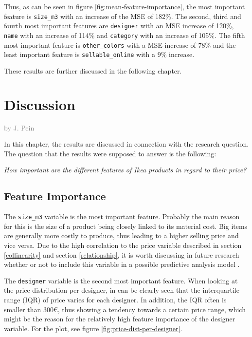 \documentclass[a4paper, nobind]{templates/ociamthesis}
\begin{document}
Thus, as can be seen in figure \ref{fig:mean-feature-importance}, the most important feature is \texttt{size\_m3} with an increase of the MSE of 182\%. The second, third and fourth most important features are \texttt{designer} with an MSE increase of 120\%, \texttt{name} with an increase of 114\% and \texttt{category} with an increase of 105\%. The fifth most important feature is \texttt{other\_colors} with a MSE increase of 78\% and the least important feature is \texttt{sellable\_online} with a 9\% increase.

These results are further discussed in the following chapter.

\hypertarget{discussion}{%
\chapter{Discussion}\label{discussion}}

\hfill\textcolor{gray}{by J. Pein}

In this chapter, the results are discussed in connection with the research question. The question that the results were supposed to answer is the following:

\emph{How important are the different features of Ikea products in regard to their price?}

\hypertarget{feature-importance-1}{%
\section{Feature Importance}\label{feature-importance-1}}

The \texttt{size\_m3} variable is the most important feature. Probably the main reason for this is the size of a product being closely linked to its material cost. Big items are generally more costly to produce, thus leading to a higher selling price and vice versa. Due to the high correlation to the price variable described in section \ref{collinearity} and section \ref{relationship}, it is worth discussing in future research whether or not to include this variable in a possible predictive analysis model .

The \texttt{designer} variable is the second most important feature. When looking at the price distribution per designer, in can be clearly seen that the interquartile range (IQR) of price varies for each designer. In addition, the IQR often is smaller than 300€, thus showing a tendency towards a certain price range, which might be the reason for the relatively high feature importance of the designer variable. For the plot, see figure \ref{fig:price-dist-per-designer}.
\end{document}
